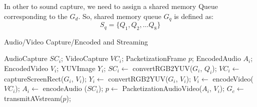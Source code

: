 \documentclass[twocolumn]{article}
\begin{document}
In other to sound capture, we need to assign a shared memory Queue corresponding to the $G_d$. So, shared memory queue $G_q$ is defined as:
\begin{equation}
S_q = \{ Q_1, Q_2, … Q_8\}  
\end{equation}
    \begin{algorithm}
    \caption{Audio/Video Capture/Encoded and Streaming}
    \label{algo:encoding}
    \begin{algorithmic}[1]
       \State AudioCapture  $SC_i$;
       \State VideoCapture  $VC_i$;
       \State PacketizationFrame  $p$;
       \State EncodedAudio $A_i$;
       \State EncodedVideo $V_i$;
       \State YUVImage  $Y_i$;	
          \State $SC_i \gets$ convertRGB2YUV($G_i$, $Q_i$);
          \State $VC_i \gets$ captureScreenRect($G_i$,  $V_i$);
	\State $Y_i \gets$ convertRGB2YUV($G_i$,  $V_i$);
	\State $V_i \gets$ encodeVideo($VC_i$);
	\State $A_i \gets$ encodeAudio ($SC_i$);
	\State $p \gets$ PacketizationAudioVideo($A_i$, $V_i$);
	\State $G_c \gets$ transmitAVstream($p$);
       \EndWhile
    \EndProcedure
    \end{algorithmic}
    \end{algorithm}
\end{document}
